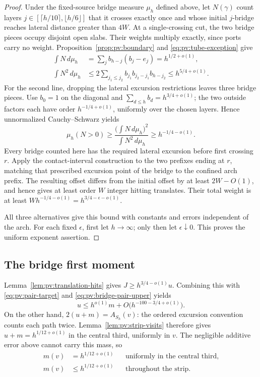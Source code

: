 \begin{proof}
Under the fixed-source bridge measure $\mu_h$ defined above, let
$N(\gamma)$ count layers
$j\in[\lceil h/10\rceil,\lfloor h/6\rfloor]$ that it crosses
exactly once and whose initial $j$-bridge reaches lateral distance
greater than $4W$. At a single-crossing cut, the two bridge pieces
occupy disjoint open slabs. Their weights multiply exactly, since
ports carry no weight. Proposition~\ref{prop:pv:boundary} and
\eqref{eq:pv:tube-exception} give
\begin{align*}
 \int N\,d\mu_h
 &=\sum_j b_{h-j}(b_j-e_j)=h^{1/2+o(1)},\\
 \int N^2\,d\mu_h
 &\le2\sum_{j_1\le j_2}
 b_{j_1}b_{j_2-j_1}b_{h-j_2}
 \le h^{5/4+o(1)}.
\end{align*}
For the second line, dropping the lateral excursion restrictions
leaves three bridge pieces. Use $b_0=1$ on the diagonal and
$\sum_{d\le h}b_d=h^{3/4+o(1)}$; the two outside factors each have
order $h^{-1/4+o(1)}$, uniformly over the chosen layers. Hence
unnormalized Cauchy--Schwarz yields
\[
 \mu_h(N>0)\ge
 \frac{\big(\int N\,d\mu_h\big)^2}{\int N^2\,d\mu_h}
 \ge h^{-1/4-o(1)}.
\]
Every bridge counted here has the required lateral excursion before
first crossing $r$. Apply the contact-interval construction to the
two prefixes ending at $r$, matching that prescribed excursion point
of the bridge to the confined arch prefix. The resulting offset
differs from the initial offset by at least $2W-O(1)$, and hence gives
at least order $W$ integer hitting translates. Their total weight is
at least $W h^{-1/4-o(1)}=h^{3/4-\epsilon-o(1)}$.

All three alternatives give this bound with constants and errors
independent of the arch. For each fixed $\epsilon$, first let
$h\to\infty$; only then let $\epsilon\downarrow0$. This proves the
uniform exponent assertion.
\end{proof}

\subsection{The bridge first moment}

Lemma~\ref{lem:pv:translation-hits} gives
$J\ge h^{3/4-o(1)}u$. Combining this with
\eqref{eq:pv:pair-target} and \eqref{eq:pv:bridge-pair-upper} yields
\[
 u\le h^{o(1)}m+O\big(h^{-100-3/4+o(1)}\big).
\]
On the other hand, $2(u+m)=A_{S_h}(v)$: the ordered excursion
convention counts each path twice. Lemma~\ref{lem:pv:strip-visits}
therefore gives $u+m=h^{1/12+o(1)}$ in the central third, uniformly
in $v$. The negligible additive error above cannot carry this mass,
so
\begin{align*}
 m(v)&=h^{1/12+o(1)}
 &&\text{uniformly in the central third},\\
 m(v)&\le h^{1/12+o(1)}
 &&\text{throughout the strip}.
\end{align*}

